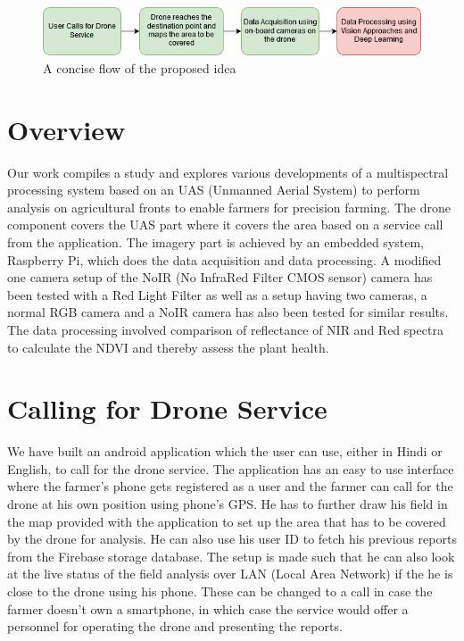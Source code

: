\begin{figure}[H]
    \centering
    \includegraphics[width=\linewidth]{SummerInterReport/project/Images-Major/Intro_Flow.png}
    \caption{A concise flow of the proposed idea}
    \label{fig:Concise Flow}
\end{figure}

\section{Overview}

Our work compiles a study and explores various developments of a multispectral processing system based on an UAS (Unmanned Aerial System) to perform analysis on agricultural fronts to enable farmers for precision farming. The drone component covers the UAS part where it covers the area based on a service call from the application. The imagery part is achieved by an embedded system, Raspberry Pi, which does the data acquisition and data processing. A modified one camera setup of the NoIR (No InfraRed Filter CMOS sensor) camera has been tested with a Red Light Filter as well as a setup having two cameras, a normal RGB camera and a NoIR camera has also been tested for similar results. The data processing involved comparison of reflectance of NIR and Red spectra to calculate the NDVI and thereby assess the plant health.


\section{Calling for Drone Service}
We have built an android application which the user can use, either in Hindi or English, to call for the drone service. The application has an easy to use interface where the farmer's phone gets registered as a user and the farmer can call for the drone at his own position using phone's GPS. He has to further draw his field in the map provided with the application to set up the area that has to be covered by the drone for analysis. He can also use his user ID to fetch his previous reports from the Firebase storage database. The setup is made such that he can also look at the live status of the field analysis over LAN (Local Area Network) if the he is close to the drone using his phone. These can be changed to a call in case the farmer doesn't own a smartphone, in which case the service would offer a personnel for operating the drone and presenting the reports.
